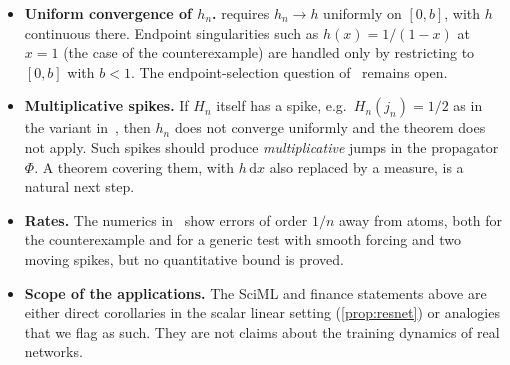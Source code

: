 \documentclass[11pt]{article}
\theoremstyle{plain}
\theoremstyle{remark}
\newcommand{\dd}{\mathrm{d}}
\begin{document}
\begin{itemize}[leftmargin=1.4em]
  \item \textbf{Uniform convergence of $h_n$.}  requires
  $h_n\to h$ uniformly on $[0,b]$, with $h$ continuous there. Endpoint singularities such as
  $h(x)=1/(1-x)$ at $x=1$ (the case of the counterexample) are handled only by restricting
  to $[0,b]$ with $b<1$. The endpoint-selection question of~\cite{principia} remains open.
  \item \textbf{Multiplicative spikes.} If $H_n$ itself has a spike, e.g.\ $H_n(j_n)=1/2$
  as in the variant in~\cite{principia}, then $h_n$ does not converge uniformly and the
  theorem does not apply. Such spikes should produce \emph{multiplicative} jumps in the
  propagator $\Phi$. A theorem covering them, with $h\,\dd x$ also replaced by a measure, is
  a natural next step.
  \item \textbf{Rates.} The numerics in~\cite{companion} show errors of order $1/n$ away
  from atoms, both for the counterexample and for a generic test with smooth forcing and two
  moving spikes, but no quantitative bound is proved.
  \item \textbf{Scope of the applications.} The SciML and finance statements above are either
  direct corollaries in the scalar linear setting (\cref{prop:resnet}) or analogies that we
  flag as such. They are not claims about the training dynamics of real networks.
\end{itemize}
\end{document}

